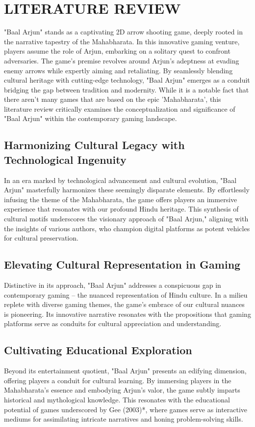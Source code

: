 \section{LITERATURE REVIEW}
"Baal Arjun" stands as a captivating 2D arrow shooting game, deeply rooted in the narrative tapestry of the Mahabharata. In this innovative gaming venture, players assume the role of Arjun, embarking on a solitary quest to confront adversaries. The game's premise revolves around Arjun's adeptness at evading enemy arrows while expertly aiming and retaliating. By seamlessly blending cultural heritage with cutting-edge technology, "Baal Arjun" emerges as a conduit bridging the gap between tradition and modernity. While it is  a notable fact that there aren't many games that are based on the epic 'Mahabharata', this literature review critically examines the conceptualization and significance of "Baal Arjun" within the contemporary gaming landscape.


\subsection{Harmonizing Cultural Legacy with Technological Ingenuity}
In an era marked by technological advancement and cultural evolution, "Baal Arjun" masterfully harmonizes these seemingly disparate elements. By effortlessly infusing the theme of the Mahabharata, the game offers players an immersive experience that resonates with our profound Hindu heritage. This synthesis of cultural motifs underscores the visionary approach of "Baal Arjun," aligning with the insights of various authors, who champion digital platforms as potent vehicles for cultural preservation.

\subsection{Elevating Cultural Representation in Gaming}
Distinctive in its approach, "Baal Arjun" addresses a conspicuous gap in contemporary gaming – the nuanced representation of Hindu culture. In a milieu replete with diverse gaming themes, the game's embrace of our cultural nuances is pioneering. Its innovative narrative resonates with the propositions that gaming platforms serve as conduits for cultural appreciation and understanding.

\subsection{Cultivating Educational Exploration}
Beyond its entertainment quotient, "Baal Arjun" presents an edifying dimension, offering players a conduit for cultural learning. By immersing players in the Mahabharata's essence and embodying Arjun's valor, the game subtly imparts historical and mythological knowledge. This resonates with the educational potential of games underscored by Gee (2003)*, where games serve as interactive mediums for assimilating intricate narratives and honing problem-solving skills.

